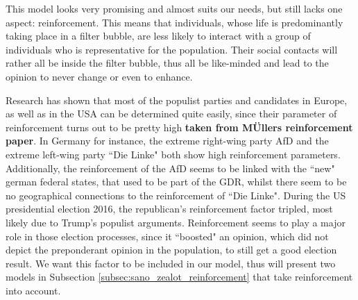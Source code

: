 \documentclass[12pt,a4paper,twoside]{article}
\begin{document}
This model looks very promising and almost suits our needs, but still lacks one aspect: reinforcement. This means that individuals, whose life is predominantly taking place in a filter bubble, are less likely to interact with a group of individuals who is representative for the population. Their social contacts will rather all be inside the filter bubble, thus all be like-minded and lead to the opinion to never change or even to enhance.

Research has shown that most of the populist parties and candidates in Europe, as well as in the USA can be determined quite easily, since their parameter of reinforcement turns out to be pretty high \textbf{taken from MÜllers reinforcement paper}. In Germany for instance, the extreme right-wing party \ac{AfD} and the extreme left-wing party ``Die Linke" both show high reinforcement parameters. Additionally, the reinforcement of the \ac{AfD} seems to be linked with the ``new" german federal states, that used to be part of the \ac{GDR}, whilst there seem to be no geographical connections to the reinforcement of ``Die Linke". During the US presidential election 2016, the republican's reinforcement factor tripled, most likely due to Trump's populist arguments.%
Reinforcement seems to play a major role in those election processes, since it ``boosted" an opinion, which did not depict the preponderant opinion in the population, to still get a good election result. We want this factor to be included in our model, thus will present two models in Subsection \ref{subsec:sano_zealot_reinforcement} that take reinforcement into account.
\end{document}
